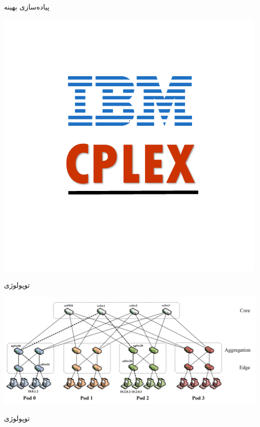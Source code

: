 \documentclass{beamer}
\begin{document}
\begin{persian}
\begin{frame}{پیاده‌سازی بهینه}
    \begin{center}
        \includegraphics[scale=0.4]{images/ibm-cplex.png}
    \end{center}
\end{frame}
\begin{frame}{توپولوژی }
    \begin{center}
        \includegraphics[scale=0.15]{images/fattree.png}
    \end{center}
\end{frame}
\begin{frame}{توپولوژی }
    \begin{center}

\end{center}
\end{frame}
\end{persian}
\end{document}
